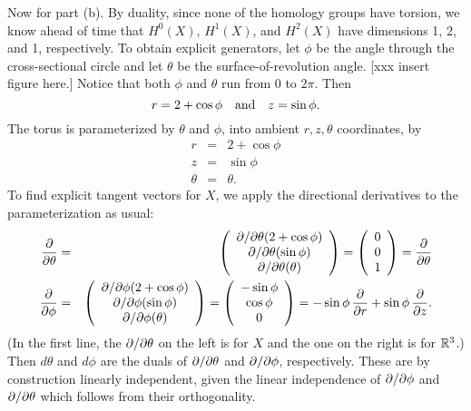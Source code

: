 \documentclass[10pt]{article}
\numberwithin{equation}{subsection}
\begin{document}
Now for part (b).  By duality, since none of the homology groups have torsion,
we know ahead of time that $H^0(X)$, $H^1(X)$, and $H^2(X)$ have dimensions 1,
2, and 1, respectively.  To obtain explicit generators, let $\phi$ be the angle
through the cross-sectional circle and let $\theta$ be the
surface-of-revolution angle.  [xxx insert figure here.] Notice that both $\phi$
and $\theta$ run from $0$ to $2\pi$.  Then
$$
	r = 2+\cos\phi \quad\textrm{and}\quad z = \sin\phi.
$$
The torus is parameterized by $\theta$ and $\phi$, into ambient $r, z, \theta$
coordinates, by
\begin{eqnarray*}
	r &=& 2+\cos\phi \\
	z &=& \sin\phi \\
	\theta &=& \theta.
\end{eqnarray*}
To find explicit tangent vectors for $X$, we apply the directional derivatives
to the parameterization as usual:
\begin{eqnarray*}
	\frac{\partial}{\partial \theta} &=&
		\left(\begin{array}{c} \partial/\partial \theta(2+\cos\phi) \\ \partial/\partial \theta(\sin\phi) \\ \partial/\partial \theta(\theta)\end{array}\right)
	= \left(\begin{array}{c} 0 \\ 0 \\ 1\end{array}\right)
	= \frac{\partial}{\partial \theta}
	\\
	\frac{\partial}{\partial \phi} &=&
		\left(\begin{array}{c} \partial/\partial \phi(2+\cos\phi) \\ \partial/\partial \phi(\sin\phi) \\ \partial/\partial \phi(\theta)\end{array}\right)
	= \left(\begin{array}{c} -\sin\phi \\ \cos\phi \\ 0\end{array}\right)
	= -\sin\phi\,\frac{\partial}{\partial r} +\sin\phi\,\frac{\partial}{\partial z}.
\end{eqnarray*}
(In the first line, the $\partial/\partial \theta$ on the left is for $X$ and the one on
the right is for $\mathbb{R}^3$.) Then $d\theta$ and $d\phi$ are the duals of
$\partial/\partial \theta$ and $\partial/\partial \phi$, respectively.  These are by construction
linearly independent, given the linear independence of $\partial/\partial \phi$ and
$\partial/\partial \theta$ which follows from their orthogonality.
\end{document}

